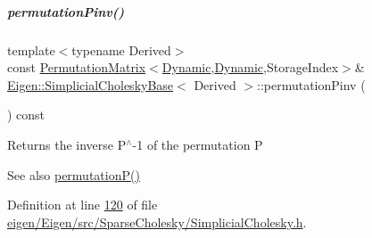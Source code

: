 \mbox{\label{group___sparse_cholesky___module_a0e23d1f4a88c211be7098faf1cb41674}} 
\subparagraph{\texorpdfstring{permutation\+Pinv()}{permutationPinv()}\hspace{0.1cm}{\footnotesize\ttfamily [1/2]}}
{\footnotesize\ttfamily template$<$typename Derived$>$ \\
const \hyperlink{group___core___module_class_eigen_1_1_permutation_matrix}{Permutation\+Matrix}$<$\hyperlink{namespace_eigen_ad81fa7195215a0ce30017dfac309f0b2}{Dynamic},\hyperlink{namespace_eigen_ad81fa7195215a0ce30017dfac309f0b2}{Dynamic},Storage\+Index$>$\& \hyperlink{group___sparse_cholesky___module_class_eigen_1_1_simplicial_cholesky_base}{Eigen\+::\+Simplicial\+Cholesky\+Base}$<$ Derived $>$\+::permutation\+Pinv (\begin{DoxyParamCaption}{ }\end{DoxyParamCaption}) const\hspace{0.3cm}{\ttfamily [inline]}}

\begin{DoxyReturn}{Returns}
the inverse P$^\wedge$-\/1 of the permutation P 
\end{DoxyReturn}
\begin{DoxySeeAlso}{See also}
\hyperlink{group___sparse_cholesky___module_aff1480e595a21726beaec9a586a94d5a}{permutation\+P()} 
\end{DoxySeeAlso}


Definition at line \hyperlink{eigen_2_eigen_2src_2_sparse_cholesky_2_simplicial_cholesky_8h_source_l00120}{120} of file \hyperlink{eigen_2_eigen_2src_2_sparse_cholesky_2_simplicial_cholesky_8h_source}{eigen/\+Eigen/src/\+Sparse\+Cholesky/\+Simplicial\+Cholesky.\+h}.

